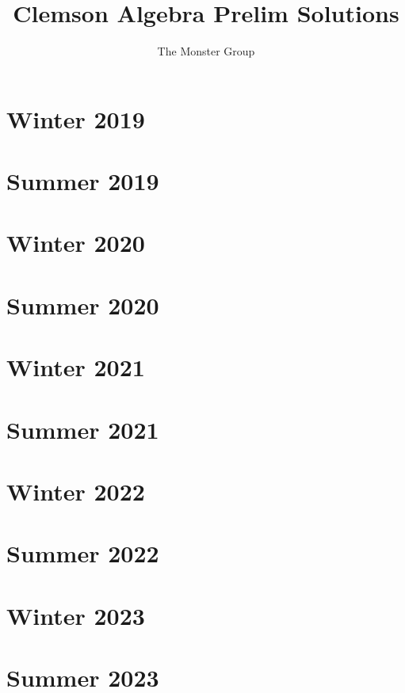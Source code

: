 \documentclass[12pt]{article}
\title{Clemson Algebra Prelim Solutions}
\author{The Monster Group}
\begin{document}
\maketitle

\tableofcontents

\newpage
\section{Winter 2019}\label{sec:w19}


\newpage
\section{Summer 2019}\label{sec:s19}


\newpage
\section{Winter 2020}\label{sec:w20}


\newpage
\section{Summer 2020}\label{sec:s20}


\newpage
\section{Winter 2021}\label{sec:w21}


\newpage
\section{Summer 2021}\label{sec:s21}


\newpage
\section{Winter 2022}\label{sec:w22}


\newpage
\section{Summer 2022}\label{sec:s22}


\newpage
\section{Winter 2023}\label{sec:w23}


\newpage
\section{Summer 2023}\label{sec:s23}

\end{document}
